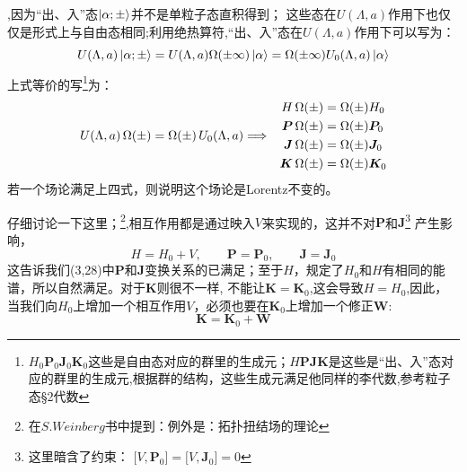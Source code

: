 \noindent
\color{blue}\normalcolor,因为“出、入”态$\ket{\alpha;\pm}$并不是单粒子态直积得到；
这些态在$U(\Lambda,a)$作用下也仅仅是形式上与自由态相同;利用绝热算符,“出、入”态在$U(\Lambda,a)$作用下可以写为：
\begin{equation}
    U(\Lambda,a)\ket{\alpha;\pm}=U(\Lambda,a)\Omega(\pm\infty)\ket{\alpha}=\Omega(\pm\infty)U_0(\Lambda,a)\ket{\alpha}
\end{equation}
上式等价的写\footnote{$H_0$$\boldsymbol P_0$$\boldsymbol J_0$$\boldsymbol K_0$这些是自由态对应的群里的生成元；$H$$\boldsymbol P$$\boldsymbol J$$\boldsymbol K$是这些是“出、入”态对应的群里的生成元,根据群的结构，这些生成元满足他同样的李代数,参考粒子态\S2代数}为：
\begin{equation}
\begin{array}{c c}
U(\Lambda,a)\,\Omega(\pm) 
= \Omega(\pm)\,U_0(\Lambda,a)\Longrightarrow 
&
\begin{aligned}
H\,\Omega(\pm) &= \Omega(\pm) H_0 \\
\boldsymbol P\,\Omega(\pm) &= \Omega(\pm) \boldsymbol P_0 \\
\boldsymbol J\,\Omega(\pm) &= \Omega(\pm) \boldsymbol J_0 \\
\boldsymbol K\,\Omega(\pm) &= \Omega(\pm) \boldsymbol K_0
\end{aligned}
\end{array}
\end{equation}
若一个场论满足上四式，则说明这个场论是Lorentz不变的。
\begin{center}
    \vspace{2ex}
        \text{\color{red}\Large ***}
    \vspace{2ex}
\end{center}
仔细讨论一下这里；\color{blue}\footnote{在$S.Weinberg$书中提到：例外是：拓扑扭结场的理论}\normalcolor,相互作用都是通过映入$V$来实现的，这并不对$\boldsymbol{P}$和$\boldsymbol{J}$\footnote{这里暗含了约束：
                                $
                                \bigl[ V, \boldsymbol{P}_0 \bigr]
                                =
                                \bigl[ V, \boldsymbol{J}_0 \bigr]
                                =
                                0
                                $}
产生影响，
\[
            H = H_0 + V,
            \qquad
            \boldsymbol{P} = \boldsymbol{P}_0,
            \qquad
            \boldsymbol{J} = \boldsymbol{J}_0
\]这告诉我们(3,28)中$\boldsymbol{P}$和$\boldsymbol{J}$变换关系的已满足；至于$H$，规定了$H_0$和$H$有相同的能谱，所以自然满足。对于$\boldsymbol{K}$则很不一样, 不能让$\boldsymbol{K}=\boldsymbol{K}_0$,这会导致$H=H_0$,因此，当我们向$H_0$上增加一个相互作用$V$，必须也要在$\boldsymbol{K}_0$上增加一个修正$\boldsymbol{W}$:
\begin{equation}
    \boldsymbol{K}=\boldsymbol{K}_0+\boldsymbol{W}
\end{equation}

